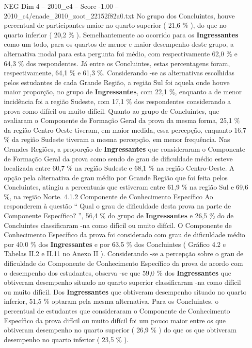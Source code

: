 \begin{textsample}{NEG Dim 4 – 2010\_c4 – Score -1.00 – 2010\_c4/enade\_2010\_zoot\_22152f82a0.txt}
No grupo dos Concluintes, houve percentual de participantes maior no quarto superior ( 21,6 \% ), do que no quarto inferior ( 20,2 \% ).
Semelhantemente ao ocorrido para os \textbf{Ingressantes} como um todo, para os quartos de menor e maior desempenho deste grupo, a alternativa modal para esta pergunta foi médio, com respectivamente 62,0 \% e 64,3 \% dos respondentes.
Já entre os Concluintes, estas percentagens foram, respectivamente, 64,1 \% e 61,3 \%.
Considerando -se as alternativas escolhidas pelos estudantes de cada Grande Região, a região Sul foi aquela onde houve maior proporção, no grupo de \textbf{Ingressantes}, com 22,1 \%, enquanto a de menor incidência foi a região Sudeste, com 17,1 \% dos respondentes considerando a prova como difícil ou muito difícil.
Quanto ao grupo de Concluintes, que avaliaram o Componente de Formação Geral da prova da mesma forma, 25,1 \% da região Centro-Oeste tiveram, em maior medida, essa percepção, enquanto 16,7 \% da região Sudeste tiveram a mesma percepção, em menor frequência.
Nas Grandes Regiões, a proporção de \textbf{Ingressantes} que consideraram o Componente de Formação Geral da prova como sendo de grau de dificuldade médio esteve localizada entre 60,7 \% na região Sudeste e 68,1 \% na região Centro-Oeste.
A opção pela alternativa de grau médio por Grande Região que foi feita pelos Concluintes, atingiu a percentuais que estiveram entre 61,9 \% na região Sul e 69,6 \%, na região Norte. 4.1.2 Componente de Conhecimento Específico Ao responderem à questão “ Qual o grau de dificuldade desta prova na parte de Componente Específico? ”, 56,4 \% do grupo de \textbf{Ingressantes} e 26,5 \% do de Concluintes classificaram -na como difícil ou muito difícil.
O Componente de Conhecimento Específico da prova foi considerado com grau de dificuldade médio por 40,0 \% dos \textbf{Ingressantes} e por 63,5 \% dos Concluintes ( Gráfico 4.2 e Tabelas II.2 e II.11 no Anexo II ).
Considerando -se a percepção sobre o grau de dificuldade do Componente de Conhecimento Específico da prova de acordo com o desempenho dos estudantes, observa -se que 59,0 \% dos \textbf{Ingressantes} que obtiveram desempenho situado no quarto superior classificaram -na como difícil ou muito difícil.
Dos \textbf{Ingressantes} que obtiveram desempenho situado no quarto inferior, 51,5 \% optaram pela mesma alternativa.
Para os Concluintes, o percentual de estudantes que consideraram o Componente de Conhecimento Específico da prova difícil ou muito difícil foi um pouco maior entre os que obtiveram desempenho no quarto superior ( 26,9 \% ) do que os que obtiveram desempenho no quarto inferior ( 23,5 \% ).

\end{textsample}
